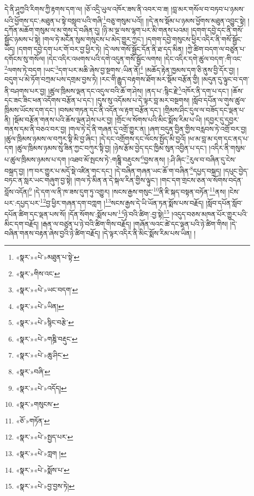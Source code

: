 དེ་ནི་ཤཱཀྱའི་རིགས་ཀྱི་རྟགས་དག་ལ། །ཅོ་འདྲི་ཡུལ་འཁོར་ཟས་ནི་འབར་བ་ཟ། །བླ་མར་གསོལ་བ་བཏབ་པ་ཉམས་པའི་ཕྱོགས་དང་:མཐུན་པ་སྟེ་བསླབ་པའི་གཞི་\footnote{«སྣར་»«པེ་»མཐུན་པ་སྟེ་}བཅུ་གསུམ་པའོ།། །།དེ་ནས་སྡོམ་པ་ཉམས་ཕྱོགས་མཐུན་འབྱུང་སྟེ། །དཀོན་མཆོག་གསུམ་ལ་མ་གུས་དེ་བཞིན་དུ། །ཉི་མ་ལྔ་ལས་ལྷག་པར་མི་གནས་པའམ། །དགག་དབྱེ་དང་ནི་གསོ་སྦྱོང་ཉམས་པ་སྟེ། །གལ་ཏེ་མངོན་སུམ་གསུངས་པ་མེད་གྱུར་ཀྱང་། །དགག་དབྱེ་གསུངས་ཕྱིར་འདིར་ནི་གསོ་སྦྱོང་ཡོད། །དགག་དབྱེ་དག་པར་གོ་བར་བྱ་ཕྱིར་ཏེ། །དེ་ལས་གསོ་སྦྱོང་དོན་ནི་ཐ་དད་མིན། །ཀྱེ་ཚིག་བདག་ལ་བཙུན་པ་དགོངས་སུ་གསོལ། །དེང་འདིར་འཕགས་པའི་དགེ་འདུན་གསོ་སྦྱོང་ལགས། །དེང་འདིར་དགེ་ཚུལ་བདག་:གི་འང་\footnote{«སྣར་»གིས་འང་}ལགས་ཏེ་བདག །ཡང་\footnote{«སྣར་»«པེ་»ཡང་བདག་}དག་པར་མཆི་ཞེས་བྱ་སྔགས་:ཡིན་ནོ།\footnote{«སྣར་»«པེ་»ཡིན།} །མཆོད་རྟེན་ཁྱམས་དག་ཅི་ནུས་བྱི་དོར་བྱ། །བདུག་པ་མེ་ཏོག་བཀྲམ་པས་དགྲམ་བྱས་ཏེ། །རང་གི་རྒྱུད་བརྟགས་ཐོག་མར་སྡོམ་བརྩོན་གྱི། །མདུན་དུ་ལྟུང་བ་དག་ནི་བཤགས་པར་བྱ། །ཚུལ་ཁྲིམས་ལྡན་དང་འདུལ་བའི་ཆོ་ག་ཤེས། །ནད་པ་:སྙིང་རྗེ་\footnote{«སྣར་»«པེ་»སྙིང་བརྩེ་}འཁོར་ནི་དག་པ་དང་། །ཆོས་དང་ཟང་ཟིང་ཕན་འདོགས་བརྩོན་པ་དང་། །དུས་སུ་འདོམས་པ་དེ་ལྟར་བླ་མར་བསྔགས། །སློབ་དཔོན་ལ་གུས་ཚུལ་ཁྲིམས་ཡོངས་དག་དང་། །བསམ་གཏན་དང་ནི་འདོན་ལ་རྟག་བརྩོན་དང་། །གྲིམས་ཤིང་དུལ་ལ་བཟོད་དང་ལྡན་པ་ནི། །སྡོམ་བརྩོན་གནས་པའི་ཆོས་ལྡན་ཤེས་པར་བྱ། །གྲོང་ལ་སོགས་པའི་མིང་སྨོས་རིམ་པ་ཡི། །དབྱར་དུ་དབྱར་གནས་དམ་ནི་བཅའ་བར་བྱ། །གལ་ཏེ་དེ་ནི་གཞན་དུ་འགྲོ་གྱུར་ན། །ཞག་བདུན་བྱིན་གྱིས་བརླབས་ཏེ་འགྲོ་བར་བྱ། །ཚུལ་ཁྲིམས་ཉམས་ལ་བཀུར་སྟི་མི་བྱ་ཞིང་། །དེ་དང་འགྲོགས་དང་ལོངས་སྤྱོད་མི་བྱའོ། །ཕ་མ་བླ་མ་དག་དང་ནད་པ་དག །ཚུལ་ཁྲིམས་ཉམས་སུ་ཟིན་ཀྱང་བཀུར་སྟི་བྱ། །ཉེས་རྩོམ་བྱེད་དང་ཁྱིམ་སུན་འབྱིན་པ་དང་། །འདིར་ནི་གསུམ་པ་ཚུལ་ཁྲིམས་ཉམས་པ་དག །འཐབ་མོ་སྤངས་ཏེ་:གཎྜཱི་བརྡུངས་\footnote{«སྣར་»«པེ་»གཎྜི་བརྡུང་}བྱས་ནས། །:ཤི་ཞིང་\footnote{«སྣར་»«པེ་»ཆུ་ཤིང་}རུལ་བ་བཞིན་དུ་ངེས་བསྐྲད་བྱ། །ཀ་བར་གྱུར་པ་མདོ་སྡེ་འཛིན་གང་དང་། །དེ་བཞིན་གཞན་ཡང་ཆོ་ག་བཞིན་\footnote{«སྣར་»བཞི་}དཔྱད་བསྐྲད། །དཔུང་བྱེད་བཏང་ན་སླར་ཡང་གཞུག་བྱ་སྟེ། །གལ་ཏེ་མིན་ན་དེ་སྐལ་རིན་གྱིས་ལྟུང་། །གང་དག་གྲངས་ཅན་ལ་སོགས་བདེན་བློས་འདོན།\footnote{«སྣར་»«པེ་»འདོད།} །དེ་དག་ལ་ནི་ཁ་ཟས་དུག་ཏུ་འགྱུར། །སངས་རྒྱས་གསུང་\footnote{«སྣར་»གསུངས་}ནི་ཇི་སྐད་བསྟན་བཏོན་\footnote{«ཅོ་»གཏོན་}ནས། །ངེས་པར་:དཔྱད་པར་\footnote{«སྣར་»«པེ་»སྤྱད་པར་}བྱ་ཕྱིར་གཞན་དག་བཀླག །\footnote{«སྣར་»«པེ་»ཀླག །}སངས་རྒྱས་དེ་ཡི་ཡོན་ཏན་སྨོས་པས་བརྗོད། །སློབ་དཔོན་སློབ་དཔོན་ཚིག་དང་ལྡན་པས་སོ། །དོན་སོགས་:སྨོས་པས་\footnote{«སྣར་»«པེ་»སྨོས་པ་}ཉེ་བའི་ཚིག་:བྱ་སྟེ།\footnote{«སྣར་»«པེ་»བྱ་བྱས་ཏེ།} །འདུད་བཅས་མཁན་པོར་གྱུར་པའི་མིང་དག་བརྗོད། །རྒན་ལ་བཙུན་པ་ཉེ་བའི་ཚིག་གིས་བརྗོད། །གཞོན་ལའང་ཚེ་དང་ལྡན་པའི་ཉེ་ཚིག་གིས། །དེ་བཞིན་གནས་བརྟན་ཞེས་བྱའི་ཉེ་ཚིག་བརྗོད། །དེ་ལྟར་འདིར་ནི་མིང་སྨོས་རིམ་པས་ཡིན། །
